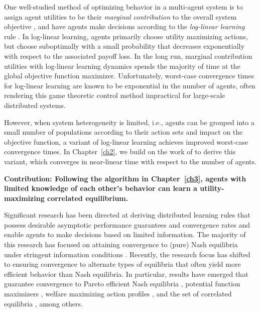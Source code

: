 One well-studied method of optimizing behavior in a multi-agent system is to assign agent utilities to be their {\it marginal contribution} to the overall system objective \cite{Wolpert1999}, and have agents make decisions according to the {\it log-linear learning} rule \cite{Blume1993}. In log-linear learning, agents primarily choose utility maximizing actions, but choose suboptimally with a small probability that decreases exponentially with respect to the associated payoff loss. In the long run, marginal contribution utilities with log-linear learning dynamics spends the majority of time at the global objective function maximizer. Unfortunately, worst-case convergence times for log-linear learning are known to be exponential in the number of agents, \cite{Shah2010} often rendering this game theoretic control method impractical for large-scale distributed systems. 

However, when system heterogeneity is limited, i.e., agents can be grouped into a small number of populations according to their action sets and impact on the objective function, a variant of log-linear learning achieves improved worst-case convergence times. In Chapter~\ref{ch2}, we build on the work of \cite{Shah2010} to derive this variant, which converges in near-linear time with respect to the number of agents. 


\smallskip

\noindent\textbf{Contribution: Following the algorithm in Chapter~\ref{ch3}, agents with limited knowledge of each other's behavior can learn a utility-maximizing correlated equilibrium.}


Significant research has been directed at deriving distributed learning rules that possess desirable asymptotic performance guarantees and convergence rates and enable agents to make decisions based on limited information. The majority of this research has focused on attaining convergence to (pure) Nash equilibria under stringent information conditions \cite{Young2009, Frihauf2012, Foster2006, Boussaton2012, Poveda2013, Gharesifard2012}. Recently, the research focus has shifted to ensuring convergence to alternate types of equilibria that often yield more efficient behavior than Nash equilibria.  In particular, results have emerged that guarantee convergence to Pareto efficient Nash equilibria \cite{Marden2009,Pradelski2012}, potential function maximizers \cite{Blume1993, Marden2012}, welfare maximizing action profiles \cite{Marden2011, Arieli2012}, and the set of correlated equilibria \cite{Hart2000,Marden2013c,Aumann1987,Foster1997}, among others.  

